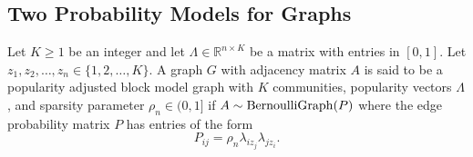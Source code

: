 \documentclass[12pt]{article}
\begin{document}
\hypertarget{the-popularity-adjusted-block-model-and-the-generalized-random-dot-product-graph}{%
\subsection{Two Probability Models for Graphs}\label{the-popularity-adjusted-block-model-and-the-generalized-random-dot-product-graph}}

\begin{definition}
\label{pabm}
Let $K \geq 1$ be an integer and let $\Lambda \in \mathbb{R}^{n \times
  K}$ be a matrix with entries in $[0,1]$. Let $z_1, z_2, \dots, z_n
\in \{1,2,\dots,K\}$. A graph $G$ with adjacency matrix $A$ is said to
be a popularity adjusted block model graph with $K$ communities, popularity vectors
$\Lambda$, and sparsity parameter $\rho_n \in (0,1]$ if $A \sim \mathrm{BernoulliGraph}(P)$
where the edge probability matrix $P$ has entries of the form
$$P_{ij} = \rho_n \lambda_{iz_j} \lambda_{jz_i}.$$
\end{definition}
\end{document}
